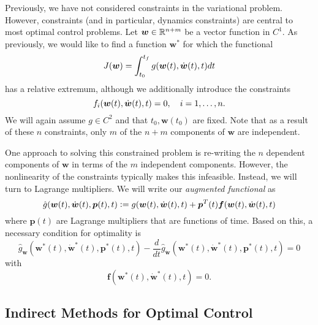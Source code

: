 Previously, we have not considered constraints in the variational problem. However, constraints (and in particular, dynamics constraints) are central to most optimal control problems. Let $\bm{w} \in \mathbb{R}^{n+m}$ be a vector function in $C^1$. As previously, we would like to find a function $\bm{w}^*$ for which the functional 
\begin{equation}
    J(\bm{w}) = \int_{t_0}^{t_f} g(\bm{w}(t),\dot{\bm{w}}(t),t) dt
\end{equation}
has a relative extremum, although we additionally introduce the constraints 
\begin{equation}
    f_i(\bm{w}(t), \dot{\bm{w}}(t),t) = 0, \quad i = 1, \ldots, n.
\end{equation}
We will again assume $g \in C^2$ and that $t_0, \bm{w}(t_0)$ are fixed. Note that as a result of these $n$ constraints, only $m$ of the $n+m$ components of $\bm{w}$ are independent. 

One approach to solving this constrained problem is re-writing the $n$ dependent components of $\bm{w}$ in terms of the $m$ independent components. However, the nonlinearity of the constraints typically makes this infeasible. Instead, we will turn to Lagrange multipliers. We will write our \textit{augmented functional} as 
\begin{equation}
    \hat{g}(\bm{w}(t),\dot{\bm{w}}(t),\bm{p}(t),t) \vcentcolon = g(\bm{w}(t),\dot{\bm{w}}(t),t) + \bm{p}^T(t) \bm{f}(\bm{w}(t),\dot{\bm{w}}(t),t)
\end{equation}
where $\bm{p}(t)$ are Lagrange multipliers that are functions of time. Based on this, a necessary condition for optimality is 
\begin{equation}
    \hat{g}_{\bm{w}}(\bm{w}^*(t),\dot{\bm{w}}^*(t),\bm{p}^*(t),t) - \frac{d}{dt} \hat{g}_{\dot{\bm{w}}}(\bm{w}^*(t),\dot{\bm{w}}^*(t),\bm{p}^*(t),t) = 0
\end{equation}
with 
\begin{equation}
    \bm{f}(\bm{w}^*(t), \dot{\bm{w}}^*(t),t) = 0.
\end{equation}


\subsection{Indirect Methods for Optimal Control}

